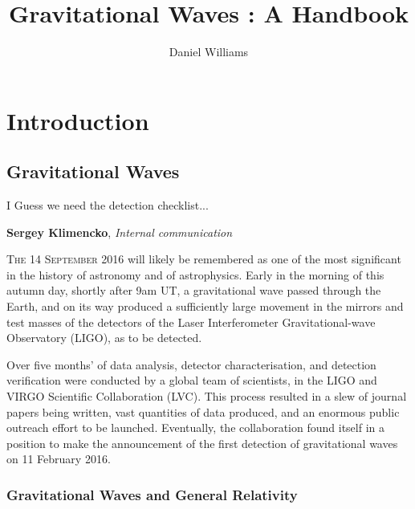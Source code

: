 \documentclass{kentigern}
\title{Gravitational Waves : A Handbook}
\author{Daniel Williams}
\begin{document}
\maketitle

\newpage

\tableofcontents

\part{Introduction}
\label{part:introduction}



\chapter{Gravitational Waves}
\label{cha:grav-waves}


\epigraph{I Guess we need the detection checklist...}{\textbf{Sergey Klimencko}, \emph{Internal communication}}

\lettrine[lines=3]{T}{he 14 September 2016} will likely be remembered as one of the most
significant in the history of astronomy and of astrophysics. Early in
the morning of this autumn day, shortly after 9am UT, a gravitational
wave passed through the Earth, and on its way produced a sufficiently
large movement in the mirrors and test masses of the detectors of the
Laser Interferometer Gravitational-wave Observatory (\gls{LIGO}), as to be
detected.

Over five months' of data analysis, detector characterisation, and
detection verification were conducted by a global team of scientists,
in the LIGO and VIRGO Scientific Collaboration (LVC). This process
resulted in a slew of journal papers being written, vast quantities of
data produced, and an enormous public outreach effort to be
launched. Eventually, the collaboration found itself in a position to
make the announcement of the first detection of gravitational waves on
11 February 2016.


\section{Gravitational Waves and General Relativity}
\label{sec:grav-waves-gener}
\end{document}
